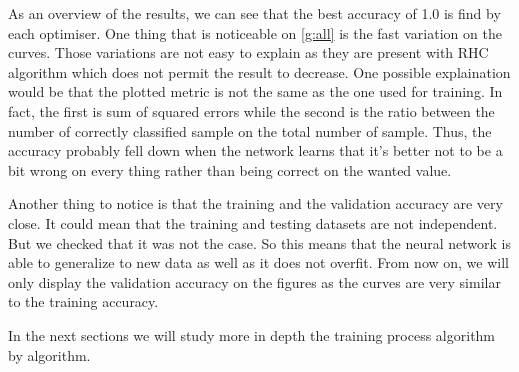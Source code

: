 \documentclass[10pt]{article}
\begin{document}
			As an overview of the results, we can see that the best accuracy of 1.0 is find by each optimiser. One thing that is noticeable on \ref{g:all} is the fast variation on the curves. Those variations are not easy to explain as they are present with RHC algorithm which does not permit the result to decrease. One possible explaination would be that the plotted metric is not the same as the one used for training. In fact, the first is sum of squared errors while the second is the ratio between the number of correctly classified sample on the total number of sample. Thus, the accuracy probably fell down when the network learns that it's better not to be a bit wrong on every thing rather than being correct on the wanted value.

			Another thing to notice is that the training and the validation accuracy are very close. It could mean that the training and testing datasets are not independent. But we checked that it was not the case. So this means that the neural network is able to generalize to new data as well as it does not overfit. From now on, we will only display the validation accuracy on the figures as the curves are very similar to the training accuracy.

			In the next sections we will study more in depth the training process algorithm by algorithm.
\end{document}
